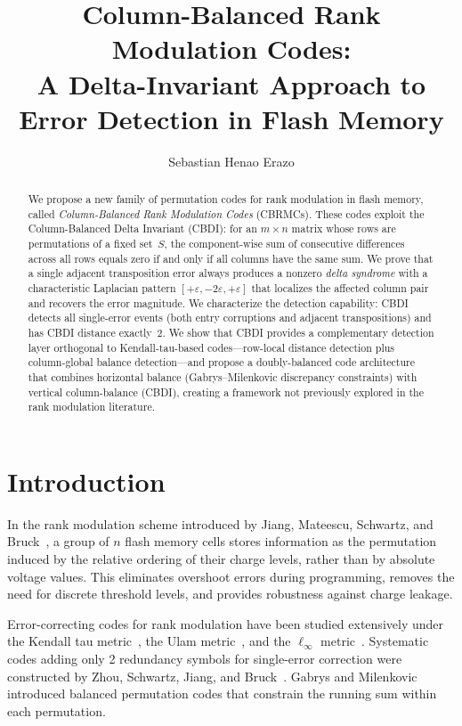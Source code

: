 \documentclass[11pt]{article}
\title{\textbf{Column-Balanced Rank Modulation Codes:\\A Delta-Invariant Approach to Error Detection in Flash Memory}}
\author{Sebastian Henao Erazo}
\date{}
\begin{document}
\maketitle

\begin{abstract}
We propose a new family of permutation codes for rank modulation in flash memory, called \emph{Column-Balanced Rank Modulation Codes} (CBRMCs). These codes exploit the Column-Balanced Delta Invariant (CBDI): for an $m\times n$ matrix whose rows are permutations of a fixed set~$S$, the component-wise sum of consecutive differences across all rows equals zero if and only if all columns have the same sum. We prove that a single adjacent transposition error always produces a nonzero \emph{delta syndrome} with a characteristic Laplacian pattern $[+\varepsilon, -2\varepsilon, +\varepsilon]$ that localizes the affected column pair and recovers the error magnitude. We characterize the detection capability: CBDI detects all single-error events (both entry corruptions and adjacent transpositions) and has CBDI distance exactly~2. We show that CBDI provides a complementary detection layer orthogonal to Kendall-tau-based codes---row-local distance detection plus column-global balance detection---and propose a doubly-balanced code architecture that combines horizontal balance (Gabrys--Milenkovic discrepancy constraints) with vertical column-balance (CBDI), creating a framework not previously explored in the rank modulation literature.
\end{abstract}

\section{Introduction}

In the rank modulation scheme introduced by Jiang, Mateescu, Schwartz, and Bruck~\cite{jiang2009}, a group of $n$ flash memory cells stores information as the permutation induced by the relative ordering of their charge levels, rather than by absolute voltage values. This eliminates overshoot errors during programming, removes the need for discrete threshold levels, and provides robustness against charge leakage.

Error-correcting codes for rank modulation have been studied extensively under the Kendall tau metric~\cite{barg2010,buzaglo2015}, the Ulam metric~\cite{farnoud2013}, and the $\ell_\infty$ metric~\cite{yehezkeally2012}. Systematic codes adding only 2 redundancy symbols for single-error correction were constructed by Zhou, Schwartz, Jiang, and Bruck~\cite{zhou2015}. Gabrys and Milenkovic~\cite{gabrys2016} introduced balanced permutation codes that constrain the running sum within each permutation.
\end{document}
